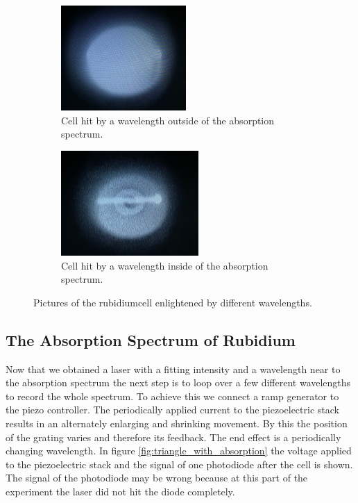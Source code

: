 \begin{figure}
  \centering
  \begin{subfigure}{0.45\textwidth}
    \centering
    \includegraphics[height = 4cm]{pics/no_fluo.jpg}
    \caption{Cell hit by a wavelength outside of the absorption spectrum.}
    \label{fig:no_fluo}
  \end{subfigure}
  \begin{subfigure}{0.45\textwidth}
    \centering
    \includegraphics[height = 4cm]{pics/fluo.jpg}
    \caption{Cell hit by a wavelength inside of the absorption spectrum.}
    \label{fig:fluo}
  \end{subfigure}
  \caption{Pictures of the rubidiumcell enlightened by different wavelengths.}
  \label{fig:fluo_no_fluo}
\end{figure}

\subsection{The Absorption Spectrum of Rubidium}

Now that we obtained a laser with a fitting intensity and a wavelength near to the absorption spectrum the next step is to loop over a few different wavelengths to record the whole spectrum. To achieve this we connect a ramp generator to the piezo controller.
The periodically applied current to the piezoelectric stack results in an alternately enlarging and shrinking movement. By this the position of the grating varies and therefore its feedback. The end effect is a periodically changing wavelength.
In figure \ref{fig:triangle_with_absorption} the voltage applied to the piezoelectric stack and the signal of one photodiode after the cell is shown. The signal of the photodiode may be wrong because at this part of the experiment the laser did not hit the diode completely.

